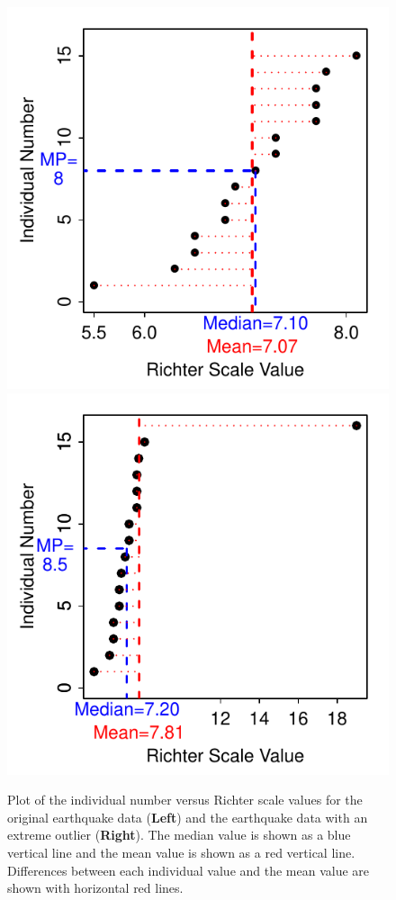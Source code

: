 \documentclass[10pt,openany]{book}\usepackage[]{graphicx}\usepackage[]{color}
\newenvironment{knitrout}{}{} %
\begin{document}
\begin{knitrout}
\color{fgcolor}\begin{figure}[hbtp]

{\centering \includegraphics[width=.45\linewidth]{Figs/MeanMedianComp1-1} 
\includegraphics[width=.45\linewidth]{Figs/MeanMedianComp1-2} 

}

\caption[Plot of the individual number versus Richter scale values for the original earthquake data (\textbf{Left}) and the earthquake data with an extreme outlier (\textbf{Right})]{Plot of the individual number versus Richter scale values for the original earthquake data (\textbf{Left}) and the earthquake data with an extreme outlier (\textbf{Right}).  The median value is shown as a blue vertical line and the mean value is shown as a red vertical line.  Differences between each individual value and the mean value are shown with horizontal red lines.}\label{fig:MeanMedianComp1}
\end{figure}


\end{knitrout}


\vspace{-12pt}
\end{document}
